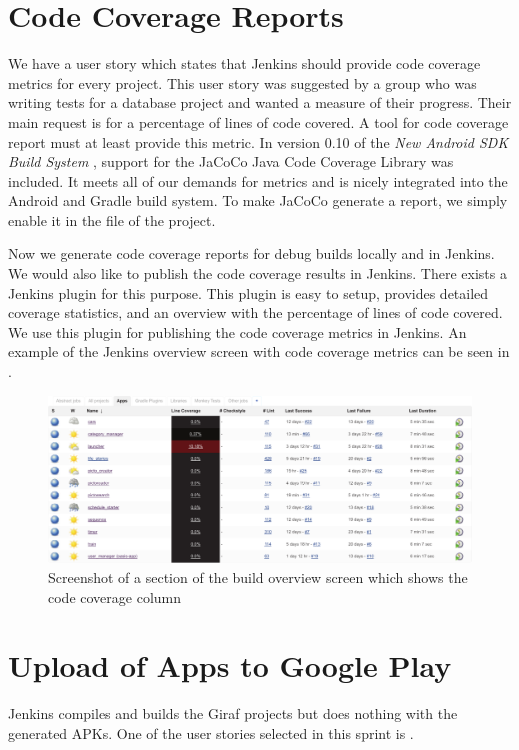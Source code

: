 \section{Code Coverage Reports}\label{sec:s3_linecoverage}
We have a user story which states that Jenkins should provide code coverage metrics for every project. This user story was suggested by a group who was writing tests for a database project and wanted a measure of their progress. Their main request is for a percentage of lines of code covered. A tool for code coverage report must at least provide this metric. In version 0.10 of the \emph{New Android SDK Build System} \parencite{new-build-android}, support for the JaCoCo \parencite{jacoco-home} Java Code Coverage Library was included. It meets all of our demands for metrics and is nicely integrated into the Android and Gradle build system. To make JaCoCo generate a report, we simply enable it in the  file of the project.

Now we generate code coverage reports for debug builds locally and in Jenkins. We would also like to publish the code coverage results in Jenkins. There exists a Jenkins plugin \parencite{jacoco-jenkins-plugin} for this purpose. This plugin is easy to setup, provides detailed coverage statistics, and an overview with the percentage of lines of code covered. We use this plugin for publishing the code coverage metrics in Jenkins. An example of the Jenkins overview screen with code coverage metrics can be seen in .

\begin{figure}[htbp]
    \includegraphics[width=\textwidth]{graphics/jenkins-overview-coco.pdf}
    \caption{Screenshot of a section of the build overview screen which shows the code coverage column}
    \label{fig:jenkins-overview-coco}
\end{figure}

\section{Upload of Apps to Google Play}\label{sec:upload_google_play}
Jenkins compiles and builds the Giraf projects but does nothing with the generated APKs. One of the user stories selected in this sprint is .

